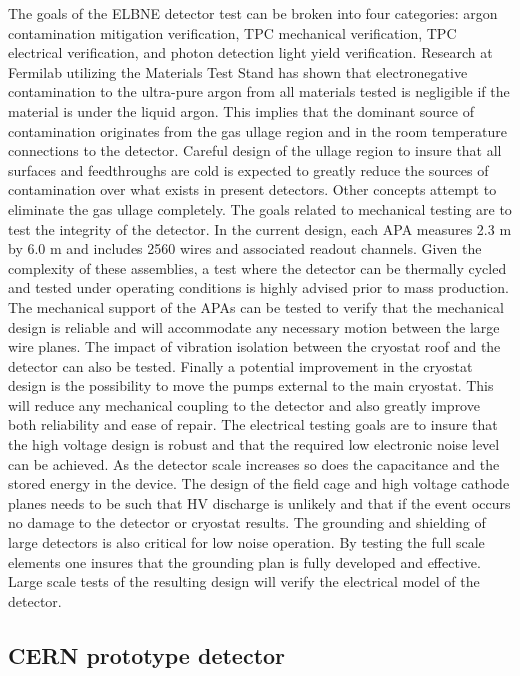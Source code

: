 The goals of the ELBNE detector test can be broken into four categories: argon contamination mitigation verification, TPC mechanical verification, TPC electrical verification, and photon detection light yield verification. Research at Fermilab utilizing the Materials Test Stand has shown that electronegative contamination to the ultra-pure argon from all materials tested is negligible if the material is under the liquid argon. This implies that the dominant source of contamination originates from the gas ullage region and in the room temperature connections to the detector. Careful design of the ullage region to insure that all surfaces and feedthroughs are cold is expected to greatly reduce the sources of contamination over what exists in present detectors. Other concepts attempt to eliminate the gas ullage completely. The goals related to mechanical testing are to test the integrity of the detector. In the current design, each APA measures 2.3 m by 6.0 m and includes 2560 wires and associated readout channels. Given the complexity of these assemblies, a test where the detector can be thermally cycled and tested under operating conditions is highly advised prior to mass production. The mechanical support of the APAs can be tested to verify that the mechanical design is reliable and will accommodate any necessary motion between the large wire planes. The impact of vibration isolation between the cryostat roof and the detector can also be tested. Finally a potential improvement in the cryostat design is the possibility to move the pumps external to the main cryostat. This will reduce any mechanical coupling to the detector and also greatly improve both reliability and ease of repair. The electrical testing goals are to insure that the high voltage design is robust and that the required low electronic noise level can be achieved. As the detector scale increases so does the capacitance and the stored energy in the device. The design of the field cage and high voltage cathode planes needs to be such that HV discharge is unlikely and that if the event occurs no damage to the detector or cryostat results. The grounding and shielding of large detectors is also critical for low noise operation. By testing the full scale elements one insures that the grounding plan is fully developed and effective. Large scale tests of the resulting design will verify the electrical model of the detector. 


\subsection{CERN prototype detector}

